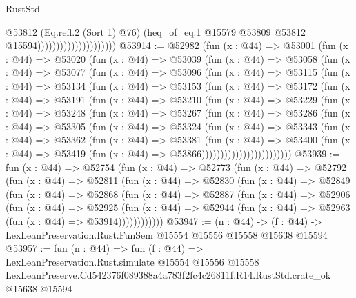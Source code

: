 \begin{lexlean}{RustStd}
\begin{coremodule}
                                            @53812
                                            (Eq.refl.{2} (Sort 1) @76)
                                            (heq_of_eq.{1}
                                              @15579
                                              @53809
                                              @53812
                                              @15594)))))))))))))))))))))
@53914 := @52982
    (fun (x : @44) =>
    @53001
      (fun (x : @44) =>
      @53020
        (fun (x : @44) =>
        @53039
          (fun (x : @44) =>
          @53058
            (fun (x : @44) =>
            @53077
              (fun (x : @44) =>
              @53096
                (fun (x : @44) =>
                @53115
                  (fun (x : @44) =>
                  @53134
                    (fun (x : @44) =>
                    @53153
                      (fun (x : @44) =>
                      @53172
                        (fun (x : @44) =>
                        @53191
                          (fun (x : @44) =>
                          @53210
                            (fun (x : @44) =>
                            @53229
                              (fun (x : @44) =>
                              @53248
                                (fun (x : @44) =>
                                @53267
                                  (fun (x : @44) =>
                                  @53286
                                    (fun (x : @44) =>
                                    @53305
                                      (fun (x : @44) =>
                                      @53324
                                        (fun (x : @44) =>
                                        @53343
                                          (fun (x : @44) =>
                                          @53362
                                            (fun (x : @44) =>
                                            @53381
                                              (fun (x : @44) =>
                                              @53400
                                                (fun (x : @44) =>
                                                @53419
                                                  (fun (x : @44) => @53866))))))))))))))))))))))))
@53939 := fun (x : @44) =>
  @52754
    (fun (x : @44) =>
    @52773
      (fun (x : @44) =>
      @52792
        (fun (x : @44) =>
        @52811
          (fun (x : @44) =>
          @52830
            (fun (x : @44) =>
            @52849
              (fun (x : @44) =>
              @52868
                (fun (x : @44) =>
                @52887
                  (fun (x : @44) =>
                  @52906
                    (fun (x : @44) =>
                    @52925
                      (fun (x : @44) =>
                      @52944 (fun (x : @44) => @52963 (fun (x : @44) => @53914))))))))))))
@53947 := (n : @44) ->
  (f : @44) -> LexLeanPreservation.Rust.FunSem @15554 @15556 @15558 @15638 @15594
@53957 := fun (n : @44) =>
  fun (f : @44) =>
  LexLeanPreservation.Rust.simulate
    @15554
    @15556
    @15558
    LexLeanPreserve.Cd542376f089388a4a783f2fc4c26811f.R14.RustStd.crate_ok
    @15638
    @15594
\end{coremodule}
\end{lexlean}
